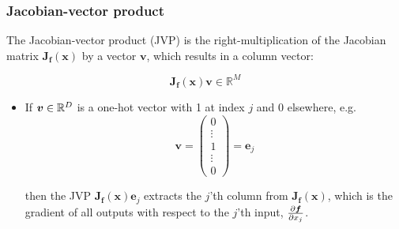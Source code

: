 \documentclass[smaller]{beamer}
\begin{document}
\begin{frame}
  \frametitle{Jacobian-vector product}\pause

  The Jacobian-vector product (JVP) is the right-multiplication of the Jacobian matrix $\bm J_{\bm f}(\bm x)$ by a vector $\bm v$, which results in a column vector:\pause

  \begin{equation}
    \bm J_{\bm f}(\bm x) \bm v \in \mathbb{R}^{M}
  \end{equation}

  \pause
\begin{itemize}
  \item If $\bm v\in \mathbb{R}^{D}$ is a one-hot vector with 1 at index $j$ and 0 elsewhere, e.g.
      \begin{equation}
        \bm v = 
        \begin{pmatrix}
          0 \\ \vdots \\ 1 \\ \vdots \\ 0
        \end{pmatrix} = \bm e_j
      \end{equation}

        then the JVP $\bm J_{\bm f}(\bm x) \bm e_j$ extracts the $j$'th column from $\bm J_{\bm f}(\bm x)$, which is the gradient of all outputs with respect to the $j$'th input, $\frac{\partial{\bm f}}{\partial{x_j}}$.
\end{itemize}
\end{frame}
\end{document}
